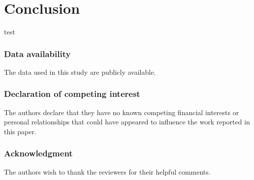 \documentclass[a4paper,fleqn]{cas-dc}
\begin{document}
\section{Conclusion}
\label{Conclusion}

test


\printcredits

\subsubsection*{Data availability}
The data used in this study are publicly available.

\subsubsection*{Declaration of competing interest}
The authors declare that they have no known competing financial interests or personal relationships that could have appeared to influence the work reported in this paper. 

\subsubsection*{Acknowledgment}
The authors wish to thank the reviewers for their helpful comments.

%



\end{document}
